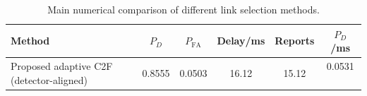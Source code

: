 \begin{table}[t]
    \centering
    \caption{Main numerical comparison of different link selection methods.}
    \label{tab:main_summary}
    \begin{tabular}{l c c c c c}
        \hline
        Method & $P_D$ & $P_{\mathrm{FA}}$ & Delay/ms & Reports & $P_D$/ms \\
        \hline
        Proposed adaptive C2F (detector-aligned) & 0.8555 & 0.0503 & 16.12 & 15.12 & 0.0531 \
        \hline
    \end{tabular}
\end{table}
